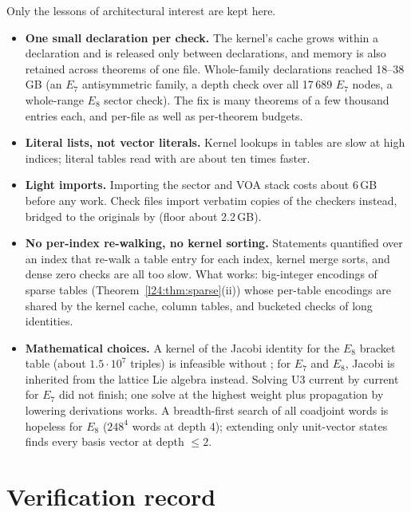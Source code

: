 \begin{warning}[title={Dead ends in kernel checking (do not retry)}]
Only the lessons of architectural interest are kept here.
\begin{itemize}
\item \textbf{One small declaration per check.} The kernel's cache grows within a declaration and is released only between
  declarations, and memory is also retained across theorems of one file. Whole-family declarations reached 18--38\,GB
  (an $E_7$ antisymmetric family, a depth check over all 17\,689 $E_7$ nodes, a whole-range $E_8$ sector check). The fix
  is many theorems of a few thousand entries each, and per-file as well as per-theorem budgets.
\item \textbf{Literal lists, not vector literals.} Kernel lookups in \lean{![…]} tables are slow at high indices; literal
   tables read with  are about ten times faster.
\item \textbf{Light imports.} Importing the sector and VOA stack costs about 6\,GB before any work. Check files import
  verbatim copies of the checkers instead, bridged to the originals by  (floor about 2.2\,GB).
\item \textbf{No per-index re-walking, no kernel sorting.} Statements quantified over an index that re-walk a table entry
  for each index, kernel merge sorts, and dense zero checks are all too slow. What works: big-integer encodings of sparse
  tables (Theorem~\ref{l24:thm:sparse}(ii)) whose per-table encodings are shared by the kernel cache, column tables, and
  bucketed checks of long identities.
\item \textbf{Mathematical choices.} A kernel  of the Jacobi identity for the $E_8$ bracket table (about
  $1.5\cdot10^7$ triples) is infeasible without ; for $E_7$ and $E_8$, Jacobi is inherited from the
  lattice Lie algebra instead. Solving U3 current by current for $E_7$ did not finish; one solve at the highest weight plus
  propagation by lowering derivations works. A breadth-first search of all coadjoint words is hopeless for $E_8$
  ($248^4$ words at depth 4); extending only unit-vector states finds every basis vector at depth $\le2$.
\end{itemize}
\end{warning}

\section{Verification record}\label{l24:sec:verification}

